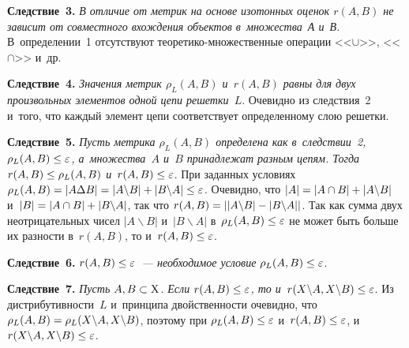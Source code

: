 \begin{multicols}{2}
\smallskip

\noindent
\textbf{Следствие~3.} \textit{В отличие от метрик на основе изотонных 
оценок $r({A}, {B})$ не зависит от совместного вхождения 
объектов в~множества~А и~В.} В~определении~1 отсутствуют  
тео\-ре\-ти\-ко-мно\-жест\-вен\-ные операции <<$\cup$>>, <<$\cap$>> и~др.

\smallskip

\noindent
\textbf{Следствие~4.} \textit{Значения метрик 
$\rho_L({A},{B})$ и~$r({A}, {B})$ равны для 
двух произвольных элементов одной цепи решетки~$L$}. Очевидно из 
следствия~2 и~того, что каж\-дый элемент цепи соответствует определенному 
слою решетки.

\smallskip

\noindent
\textbf{Следствие~5.} \textit{Пусть метрика $\rho_L({A},{B})$ 
определена как в~следствии~2, 
$\rho_L({A},{B})\hm\leq\varepsilon$, а~множества~$A$ и~$B$ 
принадлежат разным цепям. Тогда $r({A},{B})\hm\leq 
\rho_L({A},{B})$ и~$r({A},{B})\hm\leq\varepsilon$}. При заданных условиях 
$\rho_L({A},{B}) \hm= \vert {A}\Delta {B}\vert 
\hm= \vert {A}\backslash {B}\vert \hm+ \vert {B}\backslash 
{A}\vert \hm\leq \varepsilon$. Очевидно, что $\vert {A}\vert \hm= 
\vert {A}\cap {B}\vert \hm+ \vert {A}\backslash 
{B}\vert$ и~$\vert {B}\vert \hm= \vert 
{A}\cap {B}\vert \hm+ \vert {B}\backslash 
{A}\vert$, так что $r({A},{B})\hm= \vert \vert 
{A}\backslash {B}\vert \hm- \vert {B}\backslash 
{A}\vert\vert$. Так как сумма двух неотрицательных чисел $\vert 
{A}\backslash {B}\vert$ и~$\vert {B}\backslash 
{A}\vert$ в~$\rho_L({A},{B})\hm\leq\varepsilon$ не 
может быть больше их разности в~$r({A},{B})$, то и~$r({A},{B}) \hm\leq\varepsilon$.

\smallskip

\noindent
\textbf{Следствие~6.} \textit{$r({A},{B})\hm\leq 
\varepsilon$~--- необходимое условие $\rho_L({A},{B})\hm\leq 
\varepsilon$}.

\smallskip

\noindent
\textbf{Следствие~7.} \textit{Пусть $A, B \hm\subset \mathrm{X}$. Если 
$r({A},{B})\hm\leq\varepsilon$, то и~$r({X}\backslash {A}, {X}\backslash {B}) \hm\leq 
\varepsilon$}. Из дистри\-бу\-тив\-ности~$L$ и~принципа двойственности очевидно, 
что $\rho_L({A},{B}) \hm= \rho_L({X}\backslash 
{A}, {X}\backslash {B})$, поэтому при 
$\rho_L({A},{B}) \hm\leq \varepsilon$ и~$r({A},{B})\hm\leq \varepsilon$, и~$r({X}\backslash 
{A}, {X}\backslash {B})\hm\leq\varepsilon$.

\smallskip


\end{multicols}
